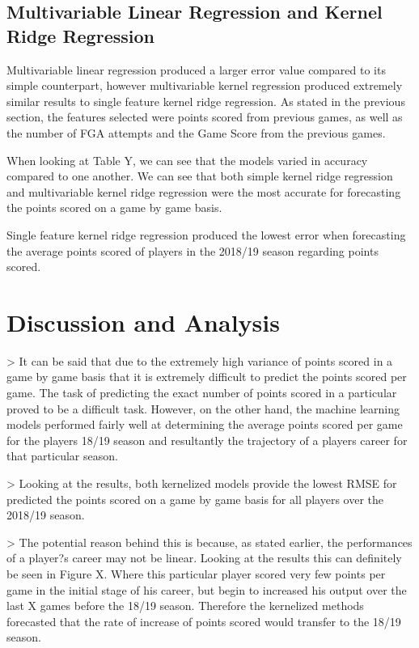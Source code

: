 \documentclass[a4paper,11pt,twoside]{article}
\begin{document}
\subsection{Multivariable Linear Regression and Kernel Ridge Regression}
Multivariable  linear regression produced a larger error value compared to its simple counterpart, however multivariable kernel regression produced extremely similar results to single feature kernel ridge regression. As stated in the previous section, the features selected were points scored from previous games, as well as the number of FGA attempts and the Game Score from the previous games.

When looking at Table Y, we can see that the models varied in accuracy compared to one another. We can see that both simple kernel ridge regression and multivariable kernel ridge regression were the most accurate for forecasting the points scored on a game by game basis.

Single feature kernel ridge regression produced the lowest error when forecasting the average points scored of players in the 2018/19 season regarding points scored.


\newpage
\section{Discussion and Analysis}

> It can be said that due to the extremely high variance of points scored in a game by game basis that it is extremely difficult to predict the points scored per game. The task of predicting the exact number of points scored in a particular proved to be a difficult task. However, on the other hand, the machine learning models performed fairly well at determining the average points scored per game for the players 18/19 season and resultantly the trajectory of a players career for that particular season.

> Looking at the results, both kernelized models provide the lowest RMSE for predicted the points scored on a game by game basis for all players over the 2018/19 season. 

> The potential reason behind this is because, as stated earlier, the performances of a player?s career may not be linear. Looking at the results this can definitely be seen in Figure X. Where this particular player scored  very few points per game in the initial stage of his career, but begin to increased his output over the last X games before the 18/19 season. Therefore the kernelized methods forecasted that the rate of increase of points scored would transfer to the 18/19 season. 
\end{document}
